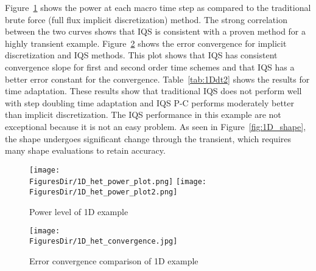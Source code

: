 \documentclass[12pt]{scrartcl}
\newcommand{\fig}[1]{Figure~\ref{#1}}                      %
\newcommand{\tbl}[1]{Table~\ref{#1}}                     %
\newcommand{\FiguresDir}{./figs}
\begin{document}
\fig{fig:power} shows the power at each macro time step as compared to the traditional brute force (full flux implicit discretization) method.  The strong correlation between the two curves shows that IQS is consistent with a proven method for a highly transient example. \fig{fig:conv} shows the error convergence for implicit discretization and IQS methods.  This plot shows that IQS has consistent convergence slope for first and second order time schemes and that IQS has a better error constant for the convergence.  \tbl{tab:1Ddt2} shows the results for time adaptation.  These results show that traditional IQS does not perform well with step doubling time adaptation and IQS P-C performs moderately better than implicit discretization.  The IQS performance in this example are not exceptional because it is not an easy problem.  As seen in \fig{fig:1D_shape}, the shape undergoes significant change through the transient, which requires many shape evaluations to retain accuracy.

\begin{figure}[!htbp]
\centering
\texttt{[image: \\FiguresDir/1D\_het\_power\_plot.png]}
\texttt{[image: \\FiguresDir/1D\_het\_power\_plot2.png]}
\caption{Power level of 1D example}
\label{fig:power}
\end{figure}

\begin{figure}[!htbp]
\centering
\texttt{[image: \\FiguresDir/1D\_het\_convergence.jpg]}
\caption{Error convergence comparison of 1D example}
\label{fig:conv}
\end{figure}
\end{document}
